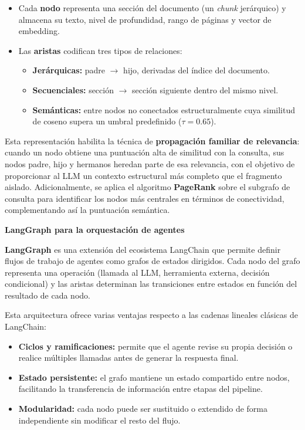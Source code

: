 \begin{itemize}
    \item Cada \textbf{nodo} representa una sección del documento (un \textit{chunk} jerárquico) y almacena su texto, nivel de profundidad, rango de páginas y vector de embedding.
    \item Las \textbf{aristas} codifican tres tipos de relaciones:
    \begin{itemize}
        \item \textbf{Jerárquicas:} padre $\rightarrow$ hijo, derivadas del índice del documento.
        \item \textbf{Secuenciales:} sección $\rightarrow$ sección siguiente dentro del mismo nivel.
        \item \textbf{Semánticas:} entre nodos no conectados estructuralmente cuya similitud de coseno supera un umbral predefinido ($\tau = 0.65$).
    \end{itemize}
\end{itemize}

Esta representación habilita la técnica de \textbf{propagación familiar de relevancia}: cuando un nodo obtiene una puntuación alta de similitud con la consulta, sus nodos padre, hijo y hermanos heredan parte de esa relevancia, con el objetivo de proporcionar al LLM un contexto estructural más completo que el fragmento aislado. Adicionalmente, se aplica el algoritmo \textbf{PageRank} sobre el subgrafo de consulta para identificar los nodos más centrales en términos de conectividad, complementando así la puntuación semántica.

\vspace{0.3cm}
\textbf{LangGraph para la orquestación de agentes}

\textbf{LangGraph} es una extensión del ecosistema LangChain que permite definir flujos de trabajo de agentes como grafos de estados dirigidos. Cada nodo del grafo representa una operación (llamada al LLM, herramienta externa, decisión condicional) y las aristas determinan las transiciones entre estados en función del resultado de cada nodo.

Esta arquitectura ofrece varias ventajas respecto a las cadenas lineales clásicas de LangChain:

\begin{itemize}
    \item \textbf{Ciclos y ramificaciones:} permite que el agente revise su propia decisión o realice múltiples llamadas antes de generar la respuesta final.
    \item \textbf{Estado persistente:} el grafo mantiene un estado compartido entre nodos, facilitando la transferencia de información entre etapas del pipeline.
    \item \textbf{Modularidad:} cada nodo puede ser sustituido o extendido de forma independiente sin modificar el resto del flujo.
\end{itemize}

